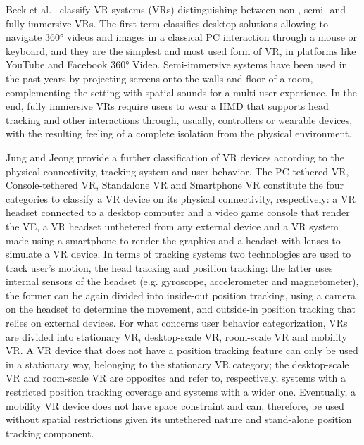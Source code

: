 Beck et al.~\cite{beck_virtual_2019} classify VR systems (VRs) distinguishing between non-, semi- and fully immersive VRs. The first term classifies desktop solutions allowing to navigate 360° videos and images in a classical PC interaction through a mouse or keyboard, and they are the simplest and most used form of VR, in platforms like YouTube and Facebook 360° Video. Semi-immersive systems have been used in the past years by projecting screens onto the walls and floor of a room, complementing the setting with spatial sounds for a multi-user experience.
In the end, fully immersive VRs require users to wear a HMD that supports head tracking and other interactions through, usually, controllers or wearable devices, with the resulting feeling of a complete isolation from the physical environment.

Jung and Jeong \cite{jung_classification_2020} provide a further classification of VR devices according to the physical connectivity, tracking system and user behavior. The PC-tethered VR, Console-tethered VR, Standalone VR and Smartphone VR constitute the four categories to classify a VR device on its physical connectivity, respectively: a VR headset connected to a desktop computer and a video game console that render the VE, a VR headset unthetered from any external device and a VR system made using a smartphone to render the graphics and a headset with lenses to simulate a VR device. In terms of tracking systems two technologies are used to track user's motion, the head tracking and position tracking: the latter uses internal sensors of the headset (e.g. gyroscope, accelerometer and magnetometer), the former can be again divided into inside-out position tracking, using a camera on the headset to determine the movement, and outside-in position tracking that relies on external devices.
For what concerns user behavior categorization, VRs are divided into stationary VR, desktop-scale VR, room-scale VR and mobility VR. A VR device that does not have a position tracking feature can only be used in a stationary way, belonging to the stationary VR category; the desktop-scale VR and room-scale VR are opposites and refer to, respectively, systems with a restricted position tracking coverage and systems with a wider one. Eventually, a mobility VR device does not have space constraint and can, therefore, be used without spatial restrictions given its untethered nature and stand-alone position tracking component.